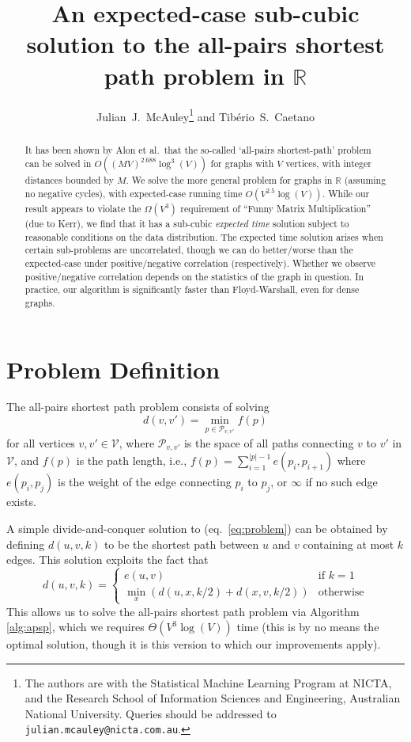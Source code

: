 \documentclass[a4paper,10pt]{article}
\title{An expected-case sub-cubic solution to the all-pairs shortest path problem in $\mathbb R$}
\author{Julian~J.~McAuley\thanks{The authors are with the Statistical Machine Learning Program at NICTA, and the Research School of Information Sciences and Engineering, Australian National University. Queries should be addressed to \texttt{julian.mcauley@nicta.com.au}.} and Tib\'erio~S.~Caetano}
\newcommand{\eq}[1]{(eq.~\ref{#1})}
\begin{document}
\maketitle

\begin{abstract}
It has been shown by Alon et al.~that the so-called `all-pairs shortest-path' problem can be solved in $O((MV)^{2.688}\log^3(V))$ for graphs with $V$ vertices, with integer distances bounded by $M$. We solve the more general problem for graphs in $\mathbb R$ (assuming no negative cycles), with expected-case running time $O(V^{2.5}\log(V))$. While our result appears to violate the $\Omega(V^3)$ requirement of ``Funny Matrix Multiplication'' (due to Kerr), we find that it has a sub-cubic \emph{expected time} solution subject to reasonable conditions on the data distribution. The expected time solution arises when certain sub-problems are uncorrelated, though we can do better/worse than the expected-case under positive/negative correlation (respectively). Whether we observe positive/negative correlation depends on the statistics of the graph in question.
In practice, our algorithm is significantly faster than Floyd-Warshall, even for dense graphs.
\end{abstract}

\section{Problem Definition}

The all-pairs shortest path problem \cite{Dijkstra59} consists of solving
\begin{equation}
 d(v, v') = \min_{p \in \mathcal P_{v,v'}} f(p)
\label{eq:problem}
\end{equation}
for all vertices $v,v'\in\mathcal V$, where $\mathcal P_{v,v'}$ is the space of all paths connecting $v$ to $v'$ in $\mathcal V$, and $f(p)$ is the path length, i.e., $f(p) = \sum_{i=1}^{|p|-1} e(p_i, p_{i+1})$ where $e(p_i, p_j)$ is the weight of the edge connecting $p_i$ to $p_j$, or $\infty$ if no such edge exists.

A simple divide-and-conquer solution to \eq{eq:problem} can be obtained by defining $d(u, v, k)$ to be the shortest path between $u$ and $v$ containing at most $k$ edges. This solution exploits the fact that
\begin{equation}
 d(u,v,k) = \left\lbrace \begin{array}{ll}
                          e(u,v) & \text{if $k = 1$}\\
                          \min_x\left( d(u,x,k/2) + d(x,v,k/2) \right) & \text{otherwise}
                         \end{array}
\right.
\end{equation}
This allows us to solve the all-pairs shortest path problem via Algorithm \ref{alg:apsp}, which we requires $\Theta(V^3\log(V))$ time (this is by no means the optimal solution, though it is this version to which our improvements apply).
\end{document}
